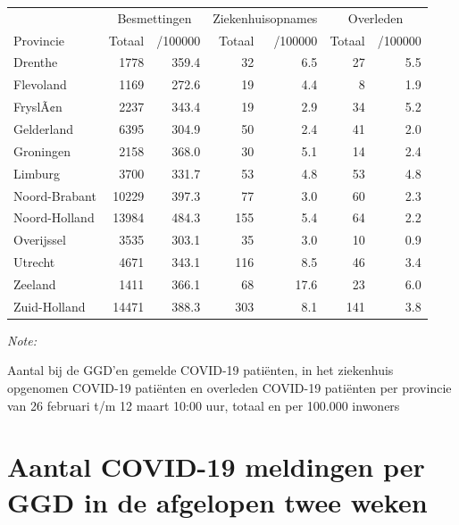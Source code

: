 \documentclass[
  english,
  man,floatsintext]{apa6}
\begin{document}
\begin{table}
\centering
\begin{threeparttable}
\begin{tabular}{lrrrrrr}
\toprule
\multicolumn{1}{c}{ } & \multicolumn{2}{c}{Besmettingen} & \multicolumn{2}{c}{Ziekenhuisopnames} & \multicolumn{2}{c}{Overleden} \\
\cmidrule(l{3pt}r{3pt}){2-3} \cmidrule(l{3pt}r{3pt}){4-5} \cmidrule(l{3pt}r{3pt}){6-7}
Provincie & Totaal & /100000 & Totaal & /100000 & Totaal & /100000\\
\midrule
Drenthe & 1778 & 359.4 & 32 & 6.5 & 27 & 5.5\\
Flevoland & 1169 & 272.6 & 19 & 4.4 & 8 & 1.9\\
FryslÃ¢n & 2237 & 343.4 & 19 & 2.9 & 34 & 5.2\\
Gelderland & 6395 & 304.9 & 50 & 2.4 & 41 & 2.0\\
Groningen & 2158 & 368.0 & 30 & 5.1 & 14 & 2.4\\
Limburg & 3700 & 331.7 & 53 & 4.8 & 53 & 4.8\\
Noord-Brabant & 10229 & 397.3 & 77 & 3.0 & 60 & 2.3\\
Noord-Holland & 13984 & 484.3 & 155 & 5.4 & 64 & 2.2\\
Overijssel & 3535 & 303.1 & 35 & 3.0 & 10 & 0.9\\
Utrecht & 4671 & 343.1 & 116 & 8.5 & 46 & 3.4\\
Zeeland & 1411 & 366.1 & 68 & 17.6 & 23 & 6.0\\
Zuid-Holland & 14471 & 388.3 & 303 & 8.1 & 141 & 3.8\\
\bottomrule
\end{tabular}
\begin{tablenotes}
\item \textit{Note: } 
\item Aantal bij de GGD’en gemelde COVID-19 patiënten, in het ziekenhuis opgenomen COVID-19 patiënten en overleden COVID-19 patiënten per provincie van 26 februari t/m 12 maart 10:00 uur, totaal en per 100.000 inwoners
\end{tablenotes}
\end{threeparttable}
\end{table}

\newpage

\hypertarget{aantal-covid-19-meldingen-per-ggd-in-de-afgelopen-twee-weken}{%
\section{Aantal COVID-19 meldingen per GGD in de afgelopen twee weken}\label{aantal-covid-19-meldingen-per-ggd-in-de-afgelopen-twee-weken}}
\end{document}
